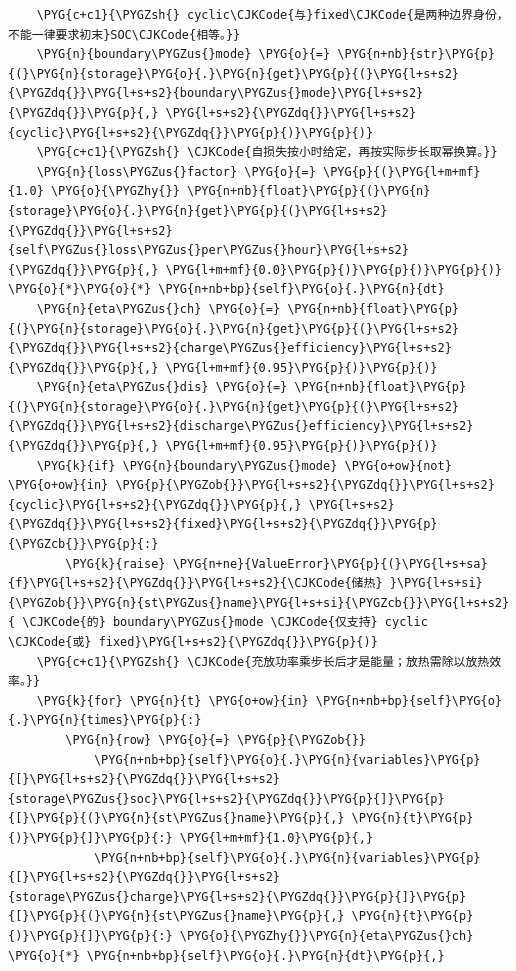 \begin{Verbatim}
    \PYG{c+c1}{\PYGZsh{} cyclic\CJKCode{与}fixed\CJKCode{是两种边界身份，不能一律要求初末}SOC\CJKCode{相等。}}
    \PYG{n}{boundary\PYGZus{}mode} \PYG{o}{=} \PYG{n+nb}{str}\PYG{p}{(}\PYG{n}{storage}\PYG{o}{.}\PYG{n}{get}\PYG{p}{(}\PYG{l+s+s2}{\PYGZdq{}}\PYG{l+s+s2}{boundary\PYGZus{}mode}\PYG{l+s+s2}{\PYGZdq{}}\PYG{p}{,} \PYG{l+s+s2}{\PYGZdq{}}\PYG{l+s+s2}{cyclic}\PYG{l+s+s2}{\PYGZdq{}}\PYG{p}{)}\PYG{p}{)}
    \PYG{c+c1}{\PYGZsh{} \CJKCode{自损失按小时给定，再按实际步长取幂换算。}}
    \PYG{n}{loss\PYGZus{}factor} \PYG{o}{=} \PYG{p}{(}\PYG{l+m+mf}{1.0} \PYG{o}{\PYGZhy{}} \PYG{n+nb}{float}\PYG{p}{(}\PYG{n}{storage}\PYG{o}{.}\PYG{n}{get}\PYG{p}{(}\PYG{l+s+s2}{\PYGZdq{}}\PYG{l+s+s2}{self\PYGZus{}loss\PYGZus{}per\PYGZus{}hour}\PYG{l+s+s2}{\PYGZdq{}}\PYG{p}{,} \PYG{l+m+mf}{0.0}\PYG{p}{)}\PYG{p}{)}\PYG{p}{)} \PYG{o}{*}\PYG{o}{*} \PYG{n+nb+bp}{self}\PYG{o}{.}\PYG{n}{dt}
    \PYG{n}{eta\PYGZus{}ch} \PYG{o}{=} \PYG{n+nb}{float}\PYG{p}{(}\PYG{n}{storage}\PYG{o}{.}\PYG{n}{get}\PYG{p}{(}\PYG{l+s+s2}{\PYGZdq{}}\PYG{l+s+s2}{charge\PYGZus{}efficiency}\PYG{l+s+s2}{\PYGZdq{}}\PYG{p}{,} \PYG{l+m+mf}{0.95}\PYG{p}{)}\PYG{p}{)}
    \PYG{n}{eta\PYGZus{}dis} \PYG{o}{=} \PYG{n+nb}{float}\PYG{p}{(}\PYG{n}{storage}\PYG{o}{.}\PYG{n}{get}\PYG{p}{(}\PYG{l+s+s2}{\PYGZdq{}}\PYG{l+s+s2}{discharge\PYGZus{}efficiency}\PYG{l+s+s2}{\PYGZdq{}}\PYG{p}{,} \PYG{l+m+mf}{0.95}\PYG{p}{)}\PYG{p}{)}
    \PYG{k}{if} \PYG{n}{boundary\PYGZus{}mode} \PYG{o+ow}{not} \PYG{o+ow}{in} \PYG{p}{\PYGZob{}}\PYG{l+s+s2}{\PYGZdq{}}\PYG{l+s+s2}{cyclic}\PYG{l+s+s2}{\PYGZdq{}}\PYG{p}{,} \PYG{l+s+s2}{\PYGZdq{}}\PYG{l+s+s2}{fixed}\PYG{l+s+s2}{\PYGZdq{}}\PYG{p}{\PYGZcb{}}\PYG{p}{:}
        \PYG{k}{raise} \PYG{n+ne}{ValueError}\PYG{p}{(}\PYG{l+s+sa}{f}\PYG{l+s+s2}{\PYGZdq{}}\PYG{l+s+s2}{\CJKCode{储热} }\PYG{l+s+si}{\PYGZob{}}\PYG{n}{st\PYGZus{}name}\PYG{l+s+si}{\PYGZcb{}}\PYG{l+s+s2}{ \CJKCode{的} boundary\PYGZus{}mode \CJKCode{仅支持} cyclic \CJKCode{或} fixed}\PYG{l+s+s2}{\PYGZdq{}}\PYG{p}{)}
    \PYG{c+c1}{\PYGZsh{} \CJKCode{充放功率乘步长后才是能量；放热需除以放热效率。}}
    \PYG{k}{for} \PYG{n}{t} \PYG{o+ow}{in} \PYG{n+nb+bp}{self}\PYG{o}{.}\PYG{n}{times}\PYG{p}{:}
        \PYG{n}{row} \PYG{o}{=} \PYG{p}{\PYGZob{}}
            \PYG{n+nb+bp}{self}\PYG{o}{.}\PYG{n}{variables}\PYG{p}{[}\PYG{l+s+s2}{\PYGZdq{}}\PYG{l+s+s2}{storage\PYGZus{}soc}\PYG{l+s+s2}{\PYGZdq{}}\PYG{p}{]}\PYG{p}{[}\PYG{p}{(}\PYG{n}{st\PYGZus{}name}\PYG{p}{,} \PYG{n}{t}\PYG{p}{)}\PYG{p}{]}\PYG{p}{:} \PYG{l+m+mf}{1.0}\PYG{p}{,}
            \PYG{n+nb+bp}{self}\PYG{o}{.}\PYG{n}{variables}\PYG{p}{[}\PYG{l+s+s2}{\PYGZdq{}}\PYG{l+s+s2}{storage\PYGZus{}charge}\PYG{l+s+s2}{\PYGZdq{}}\PYG{p}{]}\PYG{p}{[}\PYG{p}{(}\PYG{n}{st\PYGZus{}name}\PYG{p}{,} \PYG{n}{t}\PYG{p}{)}\PYG{p}{]}\PYG{p}{:} \PYG{o}{\PYGZhy{}}\PYG{n}{eta\PYGZus{}ch} \PYG{o}{*} \PYG{n+nb+bp}{self}\PYG{o}{.}\PYG{n}{dt}\PYG{p}{,}

\end{Verbatim}
